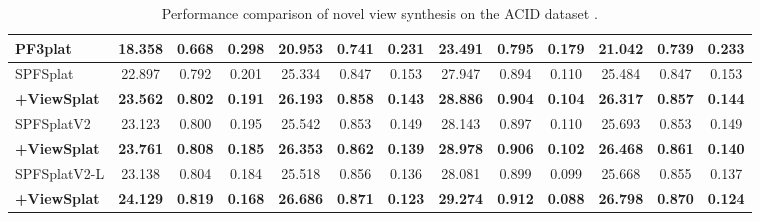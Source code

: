 \documentclass[runningheads]{llncs}
\begin{document}
\begin{table}
{\begin{tabular}{l ccc ccc ccc ccc}
            PF3plat & 18.358 & 0.668 & 0.298 & 20.953 & 0.741 & 0.231 & 23.491 & 0.795 & 0.179 & 21.042 & 0.739 & 0.233 \\ \midrule
            SPFSplat & 22.897 & 0.792 & 0.201 & 25.334 & 0.847 & 0.153 & 27.947 & 0.894 & 0.110 & 25.484 & 0.847 & 0.153 \\
            \textbf{+ViewSplat} & \textbf{23.562} & \textbf{0.802} & \textbf{0.191} & \textbf{26.193} & \textbf{0.858} & \textbf{0.143} & \textbf{28.886} & \textbf{0.904} & \textbf{0.104} & \textbf{26.317} & \textbf{0.857} & \textbf{0.144} \\ \midrule
            SPFSplatV2 & 23.123 & 0.800 & 0.195 & 25.542 & 0.853 & 0.149 & 28.143 & 0.897 & 0.110 & 25.693 & 0.853 & 0.149 \\
            \textbf{+ViewSplat} & \textbf{23.761} & \textbf{0.808} & \textbf{0.185} & \textbf{26.353} & \textbf{0.862} & \textbf{0.139} & \textbf{28.978} & \textbf{0.906} & \textbf{0.102} & \textbf{26.468} & \textbf{0.861} & \textbf{0.140} \\ \midrule
            SPFSplatV2-L & 23.138 & 0.804 & 0.184 & 25.518 & 0.856 & 0.136 & 28.081 & 0.899 & 0.099 & 25.668 & 0.855 & 0.137 \\
            \textbf{+ViewSplat}  & \textbf{24.129} & \textbf{0.819} & \textbf{0.168} & \textbf{26.686} & \textbf{0.871} & \textbf{0.123} & \textbf{29.274} & \textbf{0.912} & \textbf{0.088} & \textbf{26.798} & \textbf{0.870} & \textbf{0.124} \\ \bottomrule
    \end{tabular}
    }
\medskip
\caption{Performance comparison of novel view synthesis on the ACID dataset \cite{liu2021acid}.}
\vspace{-0.25cm}
\label{tab:nvs_acid}


\end{table}
\end{document}
